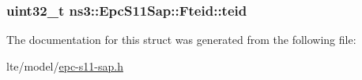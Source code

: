 \subsubsection[{\texorpdfstring{teid}{teid}}]{\setlength{\rightskip}{0pt plus 5cm}uint32\+\_\+t ns3\+::\+Epc\+S11\+Sap\+::\+Fteid\+::teid}\hypertarget{structns3_1_1EpcS11Sap_1_1Fteid_a74034d69304ed0303407c9c64ace32ee}{}\label{structns3_1_1EpcS11Sap_1_1Fteid_a74034d69304ed0303407c9c64ace32ee}


The documentation for this struct was generated from the following file\+:\begin{DoxyCompactItemize}
\item 
lte/model/\hyperlink{epc-s11-sap_8h}{epc-\/s11-\/sap.\+h}\end{DoxyCompactItemize}
